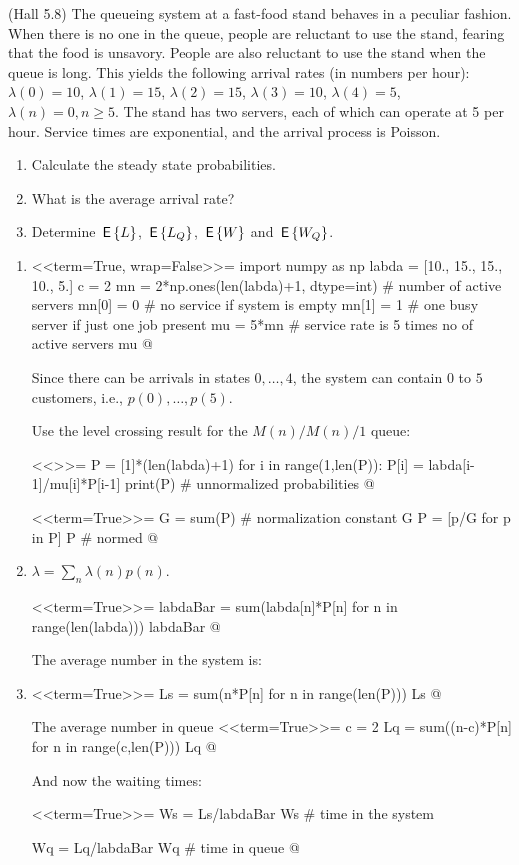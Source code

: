 \begin{question}
  (Hall 5.8) The queueing system at a fast-food stand behaves in a
  peculiar fashion. When there is no one in the queue, people are
  reluctant to use the stand, fearing that the food is
  unsavory. People are also reluctant to use the stand when the queue
  is long. This yields the following arrival rates (in numbers per hour): $\lambda(0) = 10$, $\lambda(1)=15$, $\lambda(2)=15$, $\lambda(3)=10$, $\lambda(4)=5$, $\lambda(n)=0, n\geq 5$. The stand has two servers, each of which can operate at 5 per hour. Service times are exponential, and the arrival process is Poisson.
  \begin{enumerate}
  \item Calculate the steady state probabilities.
  \item What is the average arrival rate?
  \item Determine $\,\mathsf{E}\left\{L\right\}$, $\,\mathsf{E}\left\{L_Q\right\}$, $\,\mathsf{E}\left\{W\right\}$ and $\,\mathsf{E}\left\{W_Q\right\}$.
  \end{enumerate}
  \begin{solution}
      \begin{enumerate}
      \item 

<<term=True, wrap=False>>=
import numpy as np
labda = [10., 15., 15., 10., 5.]
c = 2
mn = 2*np.ones(len(labda)+1, dtype=int)  # number of active servers
mn[0] = 0  # no service if system is empty
mn[1] = 1  # one busy server if just one job present
mu = 5*mn # service rate is 5 times no of active servers
mu
@

Since there can be arrivals in states $0,\ldots, 4$,  the system can contain $0$ to $5$ customers, i.e., $p(0),\ldots, p(5)$.

Use the level crossing result for the $M(n)/M(n)/1$ queue:

<<>>=
P = [1]*(len(labda)+1)
for i in range(1,len(P)):
    P[i] = labda[i-1]/mu[i]*P[i-1]
print(P) # unnormalized probabilities
@

<<term=True>>=
G = sum(P) # normalization constant
G
P = [p/G for p in P]
P # normed
@ 

\item 

$\lambda = \sum_{n}\lambda(n) p(n)$.

<<term=True>>=
labdaBar = sum(labda[n]*P[n] for n in range(len(labda)))
labdaBar
@


The average number in the system is: 
\item 
<<term=True>>=
Ls = sum(n*P[n] for n in range(len(P)))
Ls
@


The average number in queue 
<<term=True>>=
c = 2
Lq = sum((n-c)*P[n] for n in range(c,len(P)))
Lq
@ 

And now the waiting times:

<<term=True>>=
Ws = Ls/labdaBar
Ws # time in the system

Wq = Lq/labdaBar
Wq # time in queue
@ 

  \end{enumerate}
    \end{solution}
\end{question}


